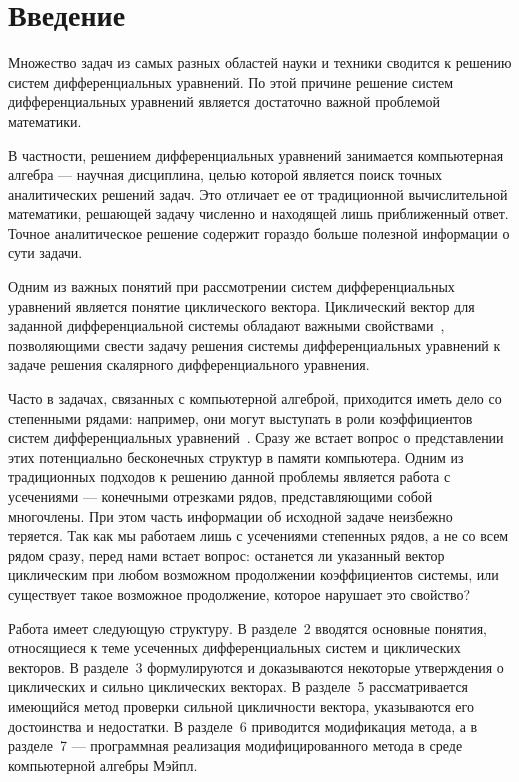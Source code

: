 \section{Введение}

Множество задач из самых разных областей науки и техники сводится к решению систем дифференциальных уравнений.
По этой причине решение систем дифференциальных уравнений является достаточно важной проблемой математики.

В частности, решением дифференциальных уравнений занимается компьютерная алгебра --- научная дисциплина, целью которой является поиск точных аналитических решений задач.
Это отличает ее от традиционной вычислительной математики, решающей задачу численно и находящей лишь приближенный ответ.
Точное аналитическое решение содержит гораздо больше полезной информации о сути задачи.
\medskip

Одним из важных понятий при рассмотрении систем дифференциальных уравнений является понятие циклического вектора.
Циклический вектор для заданной дифференциальной системы обладают важными свойствами~\cite{litKovacic},
позволяющими свести задачу решения системы дифференциальных уравнений к задаче решения скалярного дифференциального уравнения.

Часто в задачах, связанных с компьютерной алгеброй, приходится иметь дело со степенными рядами:
например, они могут выступать в роли коэффициентов систем дифференциальных уравнений~\cite{litAbramov}.
Сразу же встает вопрос о представлении этих потенциально бесконечных структур в памяти компьютера.
Одним из традиционных подходов к решению данной проблемы является работа с усечениями --- конечными отрезками рядов, представляющими собой многочлены.
При этом часть информации об исходной задаче неизбежно теряется.
Так как мы работаем лишь с усечениями степенных рядов, а не со всем рядом сразу, перед нами встает вопрос:
останется ли указанный вектор циклическим при любом возможном продолжении коэффициентов системы,
или существует такое возможное продолжение, которое нарушает это свойство?
\medskip

Работа имеет следующую структуру.
В разделе~2 вводятся основные понятия, относящиеся к теме усеченных дифференциальных систем и циклических векторов.
В разделе~3 формулируются и доказываются некоторые утверждения о циклических и сильно циклических векторах.
В разделе~5 рассматривается имеющийся метод проверки сильной цикличности вектора, указываются его достоинства и недостатки.
В разделе~6 приводится модификация метода,
а в разделе~7 --- программная реализация модифицированного метода в среде компьютерной алгебры Мэйпл.
